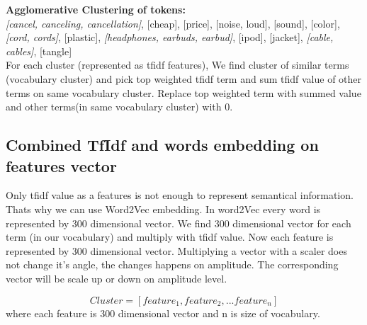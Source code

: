 \documentclass[a4paper]{article}
\begin{document}
\textbf{Agglomerative Clustering of tokens:}\\
\textit{[cancel, canceling, cancellation]}, [cheap], [price], [noise, loud], [sound], [color], \textit{[cord, cords]}, [plastic], \textit{[headphones, earbuds, earbud]}, [ipod], [jacket], \textit{[cable, cables]}, [tangle]\\


For each cluster (represented as tfidf features), We find cluster of similar terms (vocabulary cluster) and pick top weighted tfidf term and sum tfidf value of other terms on same vocabulary cluster. Replace top weighted term with summed value and other terms(in same vocabulary cluster) with 0.

\subsection{Combined TfIdf and words embedding on features vector}

Only tfidf value as a features is not enough to represent semantical information. Thats why we can use Word2Vec embedding. In word2Vec every word is represented by 300 dimensional vector. We find 300 dimensional vector for each term (in our vocabulary) and multiply with tfidf value. Now each feature is represented by 300 dimensional vector. Multiplying a vector with a scaler does not change it's angle, the changes happens on amplitude. The corresponding vector will be scale up or down on amplitude level.

$$Cluster = [feature_1, feature_2, ... feature_n]$$
where each feature is 300 dimensional vector and n is size of vocabulary.



\end{document}
